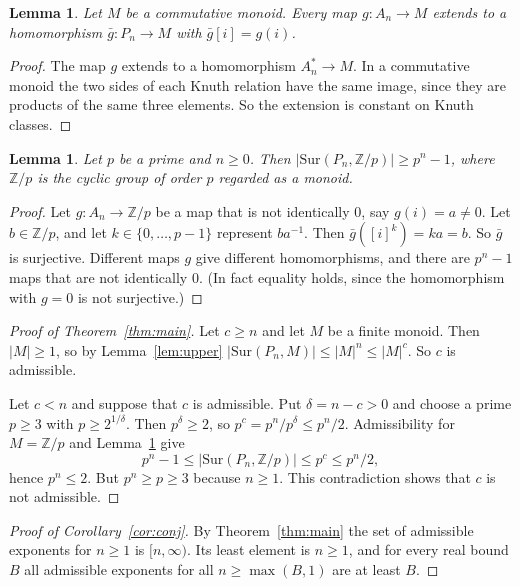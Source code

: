 \documentclass[11pt]{article}
\newtheorem{lemma}[theorem]{Lemma}
\theoremstyle{remark}
\newcommand{\Sur}{\mathrm{Sur}}
\begin{document}
\begin{lemma}\label{lem:comm}
Let $M$ be a commutative monoid. Every map $g\colon A_n\to M$ extends
to a homomorphism $\bar g\colon P_n\to M$ with $\bar g[i]=g(i)$.
\end{lemma}
\begin{proof}
The map $g$ extends to a homomorphism $A_n^*\to M$. In a commutative
monoid the two sides of each Knuth relation have the same image, since
they are products of the same three elements. So the extension is
constant on Knuth classes.
\end{proof}

\begin{lemma}\label{lem:lower}
Let $p$ be a prime and $n\ge0$. Then
$|\Sur(P_n,\mathbb Z/p)|\ge p^n-1$, where $\mathbb Z/p$ is the cyclic
group of order $p$ regarded as a monoid.
\end{lemma}
\begin{proof}
Let $g\colon A_n\to\mathbb Z/p$ be a map that is not identically $0$,
say $g(i)=a\ne0$. Let $b\in\mathbb Z/p$, and let $k\in\{0,\dots,p-1\}$
represent $ba^{-1}$. Then $\bar g([i]^k)=ka=b$. So $\bar g$ is
surjective. Different maps $g$ give different homomorphisms, and there
are $p^n-1$ maps that are not identically $0$. (In fact equality holds,
since the homomorphism with $g=0$ is not surjective.)
\end{proof}

\begin{proof}[Proof of Theorem~\ref{thm:main}]
Let $c\ge n$ and let $M$ be a finite monoid. Then $|M|\ge1$, so by
Lemma~\ref{lem:upper}
$|\Sur(P_n,M)|\le|M|^n\le|M|^c$. So $c$ is admissible.

Let $c<n$ and suppose that $c$ is admissible. Put $\delta=n-c>0$ and
choose a prime $p\ge3$ with $p\ge2^{1/\delta}$. Then $p^\delta\ge2$,
so $p^c=p^n/p^\delta\le p^n/2$. Admissibility for $M=\mathbb Z/p$ and
Lemma~\ref{lem:lower} give
\[
 p^n-1\le|\Sur(P_n,\mathbb Z/p)|\le p^c\le p^n/2 ,
\]
hence $p^n\le2$. But $p^n\ge p\ge3$ because $n\ge1$. This contradiction
shows that $c$ is not admissible.
\end{proof}

\begin{proof}[Proof of Corollary~\ref{cor:conj}]
By Theorem~\ref{thm:main} the set of admissible exponents for $n\ge1$
is $[n,\infty)$. Its least element is $n\ge1$, and for every real bound
$B$ all admissible exponents for all $n\ge\max(B,1)$ are at least $B$.
\end{proof}
\end{document}
